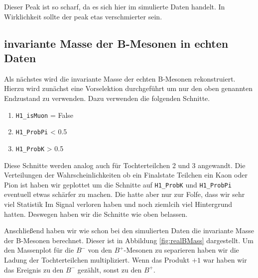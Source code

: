 Dieser Peak ist so scharf, da es sich hier im simulierte Daten handelt. In Wirklichkeit sollte der peak etas verschmierter sein.

\subsection{invariante Masse der B-Mesonen in echten Daten}
Als n\"achstes wird die invariante Masse der echten B-Mesonen rekonstruiert.
Hierzu wird zun\"achst eine Vorselektion durchgef\"uhrt um nur den oben genannten Endzustand zu verwenden.
Dazu verwenden die folgenden Schnitte.
\begin{enumerate}
  \item \texttt{H1\_isMuon} = False
  \item \texttt{H1\_ProbPi} < 0.5
  \item \texttt{H1\_ProbK} > 0.5
\end{enumerate}

Diese Schnitte werden analog auch f\"ur Tochterteilchen 2 und 3 angewandt.
Die Verteilungen der Wahrscheinlichkeiten ob ein Finalstate Teilchen ein Kaon oder Pion ist haben wir geplottet um die Schnitte auf \texttt{H1\_ProbK} und \texttt{H1\_ProbPi} eventuell etwas sch\"arfer zu machen.
Die hatte aber nur zur Folfe, dass wir sehr viel Statistik Im Signal verloren haben und noch ziemlcih viel Hintergrund hatten. Deswegen haben wir die Schnitte wie oben belassen.

Anschlie\ss end haben wir wie schon bei den simulierten Daten die invariante Masse der B-Mesonen berechnet. Dieser ist in Abbildung \ref{fig:realBMass} dargestellt. Um den Massenplot f\"ur die $B^{-}$ von den $B^{+}$-Mesonen zu separieren haben wir die Ladung der Tochterteilchen multipliziert. Wenn das Produkt $+1$ war haben wir das Ereignis zu den $B^{-}$ gez\"ahlt, sonst zu den $B^{+}$.
